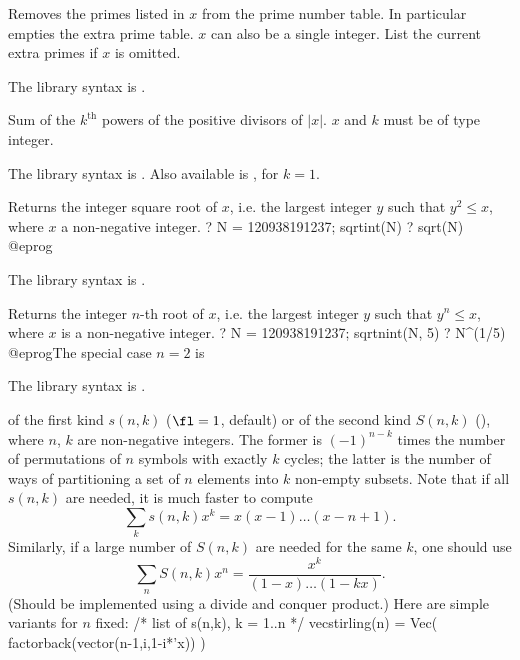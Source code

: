 \label{se:removeprimes}
Removes the primes listed in $x$ from
the prime number table. In particular  empties
the extra prime table. $x$ can also be a single integer. List the current
extra primes if $x$ is omitted.

The library syntax is .

\label{se:sigma}
Sum of the $k^{\text{th}}$ powers of the positive divisors of $|x|$. $x$
and $k$ must be of type integer.

The library syntax is .
Also available is , for $k = 1$.

\label{se:sqrtint}
Returns the integer square root of $x$, i.e. the largest integer $y$
such that $y^2 \leq x$, where $x$ a non-negative integer.
\bprog
? N = 120938191237; sqrtint(N)
? sqrt(N)
@eprog

The library syntax is .

\label{se:sqrtnint}
Returns the integer $n$-th root of $x$, i.e. the largest integer $y$ such
that $y^n \leq x$, where $x$ is a non-negative integer.
\bprog
? N = 120938191237; sqrtnint(N, 5)
? N^(1/5)
@eprog\noindent The special case $n = 2$ is 

The library syntax is .

\label{se:stirling}
 of the first kind $s(n,k)$ ($\fl=1$, default) or
of the second kind $S(n,k)$ (), where $n$, $k$ are non-negative
integers. The former is $(-1)^{n-k}$ times the
number of permutations of $n$ symbols with exactly $k$ cycles; the latter is
the number of ways of partitioning a set of $n$ elements into $k$ non-empty
subsets. Note that if all $s(n,k)$ are needed, it is much faster to compute
$$\sum_k s(n,k) x^k = x(x-1)\dots(x-n+1).$$
Similarly, if a large number of $S(n,k)$ are needed for the same $k$,
one should use
$$\sum_n S(n,k) x^n = \dfrac{x^k}{(1-x)\dots(1-kx)}.$$
(Should be implemented using a divide and conquer product.) Here are
simple variants for $n$ fixed:
\bprog
/* list of s(n,k), k = 1..n */
vecstirling(n) = Vec( factorback(vector(n-1,i,1-i*'x)) )

